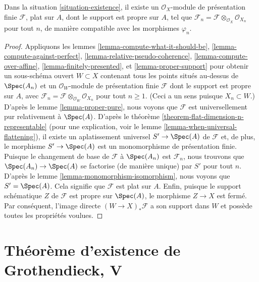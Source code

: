 \begin{theorem}
\label{theorem-existence}
Dans la situation \ref{situation-existence},
il existe un $\mathcal{O}_X$-module de présentation finie
$\mathcal{F}$, plat sur $A$, dont le support est propre sur $A$,
tel que
$\mathcal{F}_n = \mathcal{F} \otimes_{\mathcal{O}_X} \mathcal{O}_{X_n}$
pour tout $n$, de manière compatible avec les morphismes $\varphi_n$.
\end{theorem}

\begin{proof}
Appliquons les lemmes \ref{lemma-compute-what-it-should-be},
\ref{lemma-compute-against-perfect},
\ref{lemma-relative-pseudo-coherence},
\ref{lemma-compute-over-affine},
\ref{lemma-finitely-presented}, et
\ref{lemma-proper-support}
pour obtenir un sous-schéma ouvert $W \subset X$ contenant tous les points
situés au-dessus de $\Spec(A_n)$
et un $\mathcal{O}_W$-module de présentation finie $\mathcal{F}$
dont le support est propre sur $A$, avec
$\mathcal{F}_n = \mathcal{F} \otimes_{\mathcal{O}_W} \mathcal{O}_{X_n}$
pour tout $n \geq 1$. (Ceci a un sens puisque $X_n \subset W$.)
D'après le lemme \ref{lemma-proper-pure}, nous voyons que $\mathcal{F}$
est universellement pur relativement à $\Spec(A)$.
D'après le théorème \ref{theorem-flat-dimension-n-representable}
(pour une explication, voir le lemme \ref{lemma-when-universal-flattening}),
il existe un aplatissement universel $S' \to \Spec(A)$
de $\mathcal{F}$ et, de plus, le morphisme $S' \to \Spec(A)$
est un monomorphisme de présentation finie.
Puisque le changement de base de $\mathcal{F}$ à $\Spec(A_n)$
est $\mathcal{F}_n$, nous trouvons que $\Spec(A_n) \to \Spec(A)$
se factorise (de manière unique) par $S'$ pour tout $n$.
D'après le lemme \ref{lemma-monomorphism-isomorphism},
nous voyons que $S' = \Spec(A)$.
Cela signifie que $\mathcal{F}$ est plat sur $A$.
Enfin, puisque le support schématique $Z$ de $\mathcal{F}$
est propre sur $\Spec(A)$, le morphisme $Z \to X$ est fermé.
Par conséquent, l'image directe $(W \to X)_*\mathcal{F}$ a son support
dans $W$ et possède toutes les propriétés voulues.
\end{proof}






\section{Théorème d'existence de Grothendieck, V}
\label{section-existence-derived}

